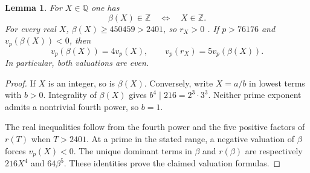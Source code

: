 \documentclass[11pt,a4paper]{article}
\newtheorem{lemma}[theorem]{Lemma}
\theoremstyle{definition}
\theoremstyle{remark}
\begin{document}
\begin{lemma}\label{sn:integral-input}
For $X\in\mathbb Q$ one has
\[
                 \beta(X)\in\mathbb Z
                 \quad\Longleftrightarrow\quad X\in\mathbb Z.
\]
For every real $X$, $\beta(X)\ge450459>2401$, so $r_X>0$
.  If $p>76176$ and $v_p(\beta(X))<0$,
then
\[
 v_p(\beta(X))=4v_p(X),\qquad
 v_p(r_X)=5v_p(\beta(X)).
\]
In particular, both valuations are even.
\end{lemma}
\begin{proof}
If $X$ is an integer, so is $\beta(X)$.  Conversely, write
$X=a/b$ in lowest terms with $b>0$.  Integrality of $\beta(X)$
gives $b^4\mid216=2^3\cdot3^3$.  Neither prime exponent
admits a nontrivial fourth power, so $b=1$.

The real inequalities follow from the fourth power and the
five positive factors of $r(T)$ when $T>2401$.  At a prime
in the stated range, a negative valuation of $\beta$ forces
$v_p(X)<0$.  The unique dominant terms in $\beta$ and
$r(\beta)$ are respectively $216X^4$ and $64\beta^5$.
These identities prove the claimed valuation formulas.
\end{proof}
\end{document}
